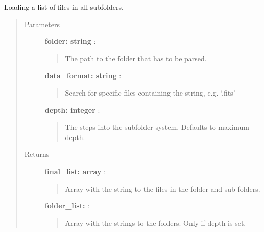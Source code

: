 \documentclass[a4paper,10pt,english]{sphinxmanual}
\begin{document}
\begin{fulllineitems}
\label{maps:astrolyze.maps.tools.get_list}
Loading a list of files in all subfolders.
\begin{quote}\begin{description}
\item[{Parameters }] \leavevmode
\textbf{folder: string} :
\begin{quote}

The path to the folder that has to be parsed.
\end{quote}

\textbf{data\_format: string} :
\begin{quote}

Search for specific files containing the string, e.g.
`.fits'
\end{quote}

\textbf{depth: integer} :
\begin{quote}

The steps into the subfolder system. Defaults to maximum depth.
\end{quote}

\item[{Returns }] \leavevmode
\textbf{final\_list: array} :
\begin{quote}

Array with the string to the files in the folder and sub folders.
\end{quote}

\textbf{folder\_list:} :
\begin{quote}

Array with the strings to the folders. Only if depth is set.
\end{quote}

\end{description}\end{quote}

\end{fulllineitems}

\end{document}
